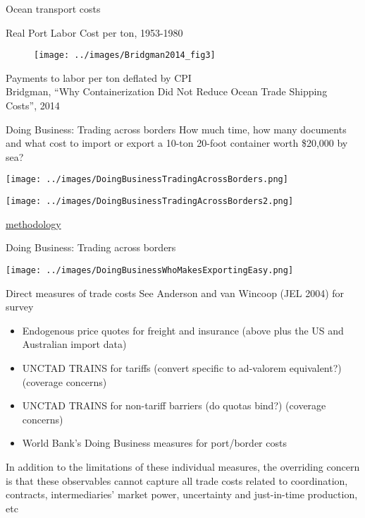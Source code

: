 \documentclass[10pt,notes=hide]{beamer}
\begin{document}
\begin{frame}{Ocean transport costs}
\begin{center} Real Port Labor Cost per ton, 1953-1980 \begin{figure}\texttt{[image: ../images/Bridgman2014\_fig3]}\end{figure} \footnotesize{Payments to labor per ton deflated by CPI}\\ \scriptsize{Bridgman, ``Why Containerization Did Not Reduce Ocean Trade Shipping Costs'', 2014}  \end{center}
\end{frame}
\begin{frame}{Doing Business: Trading across borders}
How much time, how many documents and what cost to import or export a 10-ton 20-foot container worth \$20,000 by sea? \\
\begin{minipage}{.5\textwidth}\texttt{[image: ../images/DoingBusinessTradingAcrossBorders.png]} \\ \vfill \end{minipage}
\begin{minipage}{.35\textwidth}\texttt{[image: ../images/DoingBusinessTradingAcrossBorders2.png]}\end{minipage}
\begin{center}\href{http://www.doingbusiness.org/methodology/trading-across-borders}{methodology}\end{center}
\end{frame}
\begin{frame}{Doing Business: Trading across borders}
\begin{center}\texttt{[image: ../images/DoingBusinessWhoMakesExportingEasy.png]}\end{center}
\end{frame}
\begin{frame}{Direct measures of trade costs}
See Anderson and van Wincoop (JEL 2004) for survey
\begin{itemize}
	\item Endogenous price quotes for freight and insurance (above plus the US and Australian import data)
	\item UNCTAD TRAINS for tariffs (convert specific to ad-valorem equivalent?) (coverage concerns)
	\item UNCTAD TRAINS for non-tariff barriers (do quotas bind?) (coverage concerns)
	\item World Bank's Doing Business measures for port/border costs
\end{itemize}
In addition to the limitations of these individual measures,
the overriding concern is that these observables cannot capture all trade costs related to coordination, contracts, intermediaries' market power, uncertainty and just-in-time production, etc
\end{frame}
\end{document}
